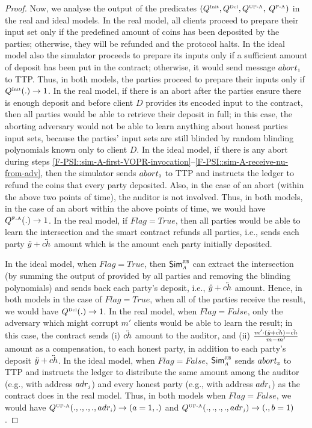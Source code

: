 \begin{proof}
Now, we analyse the output of the predicates $(Q^{\scriptscriptstyle \text{Init}}, Q^{\scriptscriptstyle \text{Del}}, Q^{\scriptscriptstyle \text{UF-A}}, $ $Q^{\scriptscriptstyle \text{F-A}})$ in the real and ideal models. In the real model, all clients proceed to prepare their input set only if the predefined amount of coins has been deposited by the parties; otherwise, they will be refunded and the protocol halts. In the ideal model also the simulator proceeds to prepare its inputs only if a sufficient amount of deposit has been put in the contract; otherwise, it would send message $abort_{\scriptscriptstyle 1}$ to TTP. Thus, in both models, the parties proceed to prepare their inputs only if $Q^{\scriptscriptstyle \text{Init}}(.) \rightarrow1$. 
%
In the real model, if there is an abort after the parties ensure there is enough deposit and before client $D$ provides its encoded input to the contract, then all parties would be able to retrieve their deposit in full; in this case, the aborting adversary would not be able to learn anything about honest parties input sets, because the parties' input sets are still blinded by random blinding polynomials known only to client $D$. In the ideal model, if there is any abort during steps \ref{F-PSI::sim-A-first-VOPR-invocation}--\ref{F-PSI::sim-A-receive-nu-from-adv}, then the simulator sends $abort_{\scriptscriptstyle 2}$ to TTP and instructs the ledger to refund the coins that every party deposited. Also, in the case of an abort (within the above two points of time), the auditor is not involved. Thus, in both models,  in the case of an abort within the above points of time, we would have $Q^{\scriptscriptstyle \text{F-A}}(.)\rightarrow1$. In the real model, if $Flag=True$, then all parties would be able to learn the intersection and the smart contract refunds all parties, i.e., sends each party $\ddot{y}+\ddot{ch}$ amount which is the amount each party initially deposited. 

In the ideal model, when $Flag=True$, then $\mathsf{Sim}^{\scriptscriptstyle \mathtt{JUS}}_{\scriptscriptstyle A}$ can extract the intersection (by summing the output of \vopr provided by all parties and removing the blinding polynomials) and sends back each party's deposit, i.e., $\ddot{y}+\ddot{ch}$ amount. Hence, in both models in the case of $Flag=True$, when all of the parties receive the result, we would have $Q^{\scriptscriptstyle \text{Del}}(.)\rightarrow 1$. In the real model, when $Flag=False$, only the adversary which might corrupt $m'$ clients would be able to learn the result; in this case, the contract sends (i) $\ddot{ch}$ amount to the auditor, and (ii) $\frac{m'\cdot (\ddot{y}+\ddot{ch})-\ddot{ch}}{m-m'}$ amount as a compensation, to each honest party, in addition to each party's deposit $\ddot{y}+\ddot{ch}$. In the ideal model,  when $Flag=False$, $\mathsf{Sim}^{\scriptscriptstyle \mathtt{JUS}}_{\scriptscriptstyle A}$  sends $abort_{\scriptscriptstyle 3}$ to TTP and instructs the ledger to distribute the same amount among the auditor (e.g., with address $adr_{\scriptscriptstyle j}$) and every honest party (e.g., with address $adr_{\scriptscriptstyle i}$) as the contract does in the real model. Thus, in both models when $Flag=False$, we would have $Q^{\scriptscriptstyle \text{UF-A}}(., ., ., ., adr_{\scriptscriptstyle i})\rightarrow (a=1, .)$ and  $Q^{\scriptscriptstyle \text{UF-A}}(., ., ., ., adr_{\scriptscriptstyle j})\rightarrow (., b=1)$. 


\end{proof}
